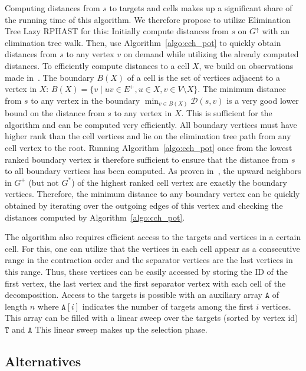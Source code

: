 \documentclass[a4paper, english, cleveref]{lipics-v2021}
\newcommand*{\dist}{\mathcal{D}}
\newcommand*{\gchu}{G^{\uparrow}}
\begin{document}
Computing distances from $s$ to targets and cells makes up a significant share of the running time of this algorithm.
We therefore propose to utilize Elimination Tree Lazy RPHAST for this:
Initially compute distances from $s$ on $\gchu$ with an elimination tree walk.
Then, use Algorithm~\ref{algo:cch_pot} to quickly obtain distances from $s$ to any vertex $v$ on demand while utilizing the already computed distances.
To efficiently compute distances to a cell $X$, we build on observations made in~\cite{TODO}.
The boundary $B(X)$ of a cell is the set of vertices adjacent to a vertex in $X$: $B(X) = \{ v \mid uv \in E^+, u \in X, v \in V \setminus X \}$.
The minimum distance from $s$ to any vertex in the boundary $\min_{v \in B(X)} \dist(s, v)$ is a very good lower bound on the distance from $s$ to any vertex in $X$.
This is sufficient for the algorithm and can be computed very efficiently.
All boundary vertices must have higher rank than the cell vertices and lie on the elimination tree path from any cell vertex to the root.
Running Algorithm~\ref{algo:cch_pot} once from the lowest ranked boundary vertex is therefore sufficient to ensure that the distance from $s$ to all boundary vertices has been computed.
As proven in~\cite{TODO}, the upward neighbors in $G^+$ (but not $G^*$) of the highest ranked cell vertex are exactly the boundary vertices.
Therefore, the minimum distance to any boundary vertex can be quickly obtained by iterating over the outgoing edges of this vertex and checking the distances computed by Algorithm~\ref{algo:cch_pot}.

The algorithm also requires efficient access to the targets and vertices in a certain cell.
For this, one can utilize that the vertices in each cell appear as a consecutive range in the contraction order and the separator vertices are the last vertices in this range.
Thus, these vertices can be easily accessed by storing the ID of the first vertex, the last vertex and the first separator vertex with each cell of the decomposition.
Access to the targets is possible with an auxiliary array $\mathtt{A}$ of length $n$ where $\mathtt{A}[i]$ indicates the number of targets among the first $i$ vertices.
This array can be filled with a linear sweep over the targets (sorted by vertex id) $\mathtt{T}$ and $\mathtt{A}$
This linear sweep makes up the selection phase.

\subsection{Alternatives}
\end{document}
